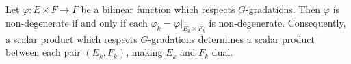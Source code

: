 Let $\varphi: E \times F \rightarrow \Gamma$ be a bilinear function which respects $G$-gradations. Then $\varphi$ is non-degenerate if and only if each $\varphi_k = \varphi|_{E_k \times F_k}$ is non-degenerate. Consequently, a scalar product which respects $G$-gradations determines a scalar product between each pair $(E_k, F_k)$, making $E_k$ and $F_k$ dual.
